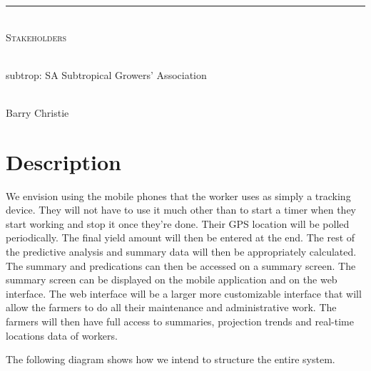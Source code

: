 \documentclass[12pt]{article}
\begin{document}
\begin{titlepage}
\begin{center}
		\rule{\linewidth}{0.5mm} \\[1cm] 
		\textsc{\Large Stakeholders}\\[1cm]	
		
		\begin{minipage}{0.4\textwidth}
			\begin{flushleft} \large
				\emph{} \\
				subtrop: SA Subtropical Growers' Association
			\end{flushleft}
		\end{minipage}
		\begin{minipage}{0.4\textwidth}
			\begin{flushright} \large
				\emph{} \\
				Barry Christie
			\end{flushright}
		\end{minipage}

		
	\end{center}
\end{titlepage}
	
    \newpage
	\tableofcontents
	\newpage
	
	\section{Description}
	We envision using the mobile phones that the worker uses as simply a tracking device. They will not have to use it much other than to start a timer when they start working and stop it once they're done. Their GPS location will be polled periodically. The final yield amount will then be entered at the end. The rest of the predictive analysis and summary data will then be appropriately calculated. The summary and predications can then be accessed on a summary screen. The summary screen can be displayed on the mobile application and on the web interface. The web interface will be a larger more customizable interface that will allow the farmers to do all their maintenance and administrative work. The farmers will then have full access to summaries, projection trends and real-time locations data of workers.
	
	The following diagram shows how we intend to structure the entire system.
	
\end{document}
